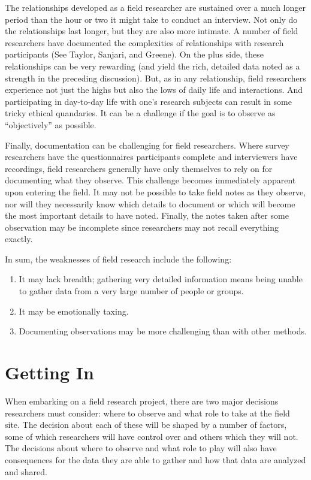 The relationships developed as a field researcher are sustained over a much longer period than the hour or two it might take to conduct an interview. Not only do the relationships last longer, but they are also more intimate. A number of field researchers have documented the complexities of relationships with research participants (See Taylor\cite{taylor2011intimate}, Sanjari\cite{sanjari2014ethical}, and Greene\cite{greene2014inside}). On the plus side, these relationships can be very rewarding (and yield the rich, detailed data noted as a strength in the preceding discussion). But, as in any relationship, field researchers experience not just the highs but also the lows of daily life and interactions. And participating in day-to-day life with one's research subjects can result in some tricky ethical quandaries. It can be a challenge if the goal is to observe as ``objectively'' as possible.

Finally, documentation can be challenging for field researchers. Where survey researchers have the questionnaires participants complete and interviewers have recordings, field researchers generally have only themselves to rely on for documenting what they observe. This challenge becomes immediately apparent upon entering the field. It may not be possible to take field notes as they observe, nor will they necessarily know which details to document or which will become the most important details to have noted. Finally, the notes taken after some observation may be incomplete since researchers may not recall everything exactly.

In sum, the weaknesses of field research include the following:

\begin{enumerate}
	\item It may lack breadth; gathering very detailed information means being unable to gather data from a very large number of people or groups.
	\item It may be emotionally taxing.
	\item Documenting observations may be more challenging than with other methods.
\end{enumerate}

\section{Getting In}

When embarking on a field research project, there are two major decisions researchers must consider: where to observe and what role to take at the field site. The decision about each of these will be shaped by a number of factors, some of which researchers will have control over and others which they will not. The decisions about where to observe and what role to play will also have consequences for the data they are able to gather and how that data are analyzed and shared.

